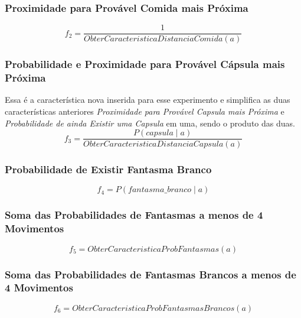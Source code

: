 \subsubsection*{Proximidade para Provável Comida mais Próxima}
$$ f_2 = \frac{1}{ObterCaracteristicaDistanciaComida \left( a \right)} $$

\subsubsection*{Probabilidade e Proximidade para Provável Cápsula mais Próxima }

Essa é a característica nova inserida para esse experimento e simplifica as duas características anteriores \textit{Proximidade para Provável Capsula mais Próxima} e \textit{Probabilidade de ainda Existir uma Capsula} em uma, sendo o produto das duas.
$$ f_3 = \frac{P \left( capsula \mid a \right)}{ObterCaracteristicaDistanciaCapsula \left( a \right)} $$

\subsubsection*{Probabilidade de Existir Fantasma Branco}
$$ f_4 = P \left( fantasma\_branco \mid a \right) $$

\subsubsection*{Soma das Probabilidades de Fantasmas a menos de 4 Movimentos}
$$ f_5 = ObterCaracteristicaProbFantasmas \left( a \right) $$

\subsubsection*{Soma das Probabilidades de Fantasmas Brancos a menos de 4 Movimentos}
$$ f_6 = ObterCaracteristicaProbFantasmasBrancos \left( a \right) $$



